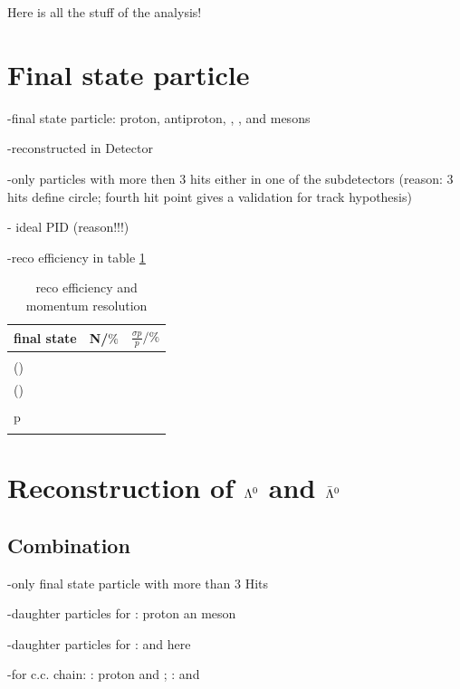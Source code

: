 Here is all the stuff of the analysis!

\section{Final state particle}
	-final state particle: proton, antiproton, \piminus, \piplus, \kminus and \kplus mesons
	
	-reconstructed in Detector
	
	-only particles with more then 3 hits either in one of the subdetectors (reason: 3 hits define circle; fourth hit point gives a validation for track hypothesis)
	
	- ideal PID (reason!!!)
	
	-reco efficiency in table \ref{tab:finalstate_recoeff}
	
	\begin{table}
		\centering
		\caption{reco efficiency and momentum resolution}
		\label{tab:finalstate_recoeff}
		\begin{tabular}{lll}
			\hline
			final state & N/$\%$ & $\frac{\sigma p}{p}/\%$ \\
			\hline
			\hline
			\piminus &  & \\
			\piplusone(\anticascade) &  & \\
			\piplustwo(\alam) &  &\\
			\kminus&  &\\
			p &  &\\
			\antiproton &  &\\\hline
			 
		\end{tabular}
	\end{table}
	

	
\section{Reconstruction of $\boldmath{\Lambda}^0$ and $\boldmath{\bar{\Lambda}^0}$}
	\subsection{Combination}
		-only final state particle with more than 3 Hits
		
		-daughter particles for \lam: proton an \piminus meson
		
		-daughter particles for \alam: \antiproton and \piplus here \piplustwo 
		
		-for c.c. chain: \lam: proton and \piminustwo; \alam: \antiproton and \piplus 
		
